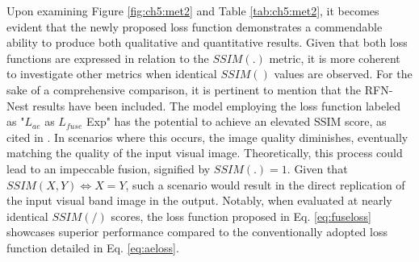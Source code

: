 Upon examining Figure \ref{fig:ch5:met2} and Table \ref{tab:ch5:met2}, it becomes evident that the newly proposed loss function demonstrates a commendable ability to produce both qualitative and quantitative results. Given that both loss functions are expressed in relation to the \(SSIM(.)\) metric, it is more coherent to investigate other metrics when identical \(SSIM()\) values are observed. For the sake of a comprehensive comparison, it is pertinent to mention that the RFN-Nest results have been included. The model employing the loss function labeled as "\(L_{ae}\) as \(L_{fuse}\) Exp" has the potential to achieve an elevated SSIM score, as cited in \cite{ma2015perceptual}. In scenarios where this occurs, the image quality diminishes, eventually matching the quality of the input visual image. Theoretically, this process could lead to an impeccable fusion, signified by \(SSIM(.) = 1\). Given that \(SSIM(X,Y) \iff X=Y\), such a scenario would result in the direct replication of the input visual band image in the output. Notably, when evaluated at nearly identical \(SSIM(/)\) scores, the loss function proposed in Eq. \ref{eq:fuseloss} showcases superior performance compared to the conventionally adopted loss function detailed in Eq. \ref{eq:aeloss}.\

